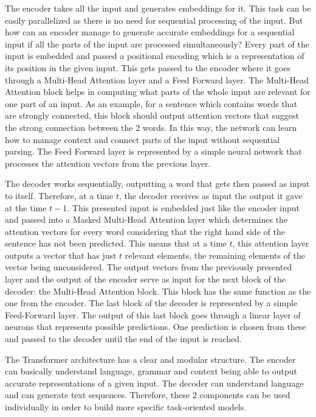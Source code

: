\documentclass[12pt,a4paper]{report}
\begin{document}
The encoder takes all the input and generates embeddings for it. This task can be easily parallelized as there is no need for sequential processing of the input. But how can an encoder manage to generate accurate embeddings for a sequential input if all the parts of the input are processed simultaneously? Every part of the input is embedded and passed a positional encoding which is a representation of its position in the given input. This gets passed to the encoder where it goes through a Multi-Head Attention layer and a Feed Forward layer. The Multi-Head Attention block helps in computing what parts of the whole input are relevant for one part of an input. As an example, for a sentence which contains words that are strongly connected, this block should output attention vectors that suggest the strong connection between the 2 words. In this way, the network can learn how to manage context and connect parts of the input without sequential parsing. The Feed Forward layer is represented by a simple neural network that processes the attention vectors from the previous layer.

The decoder works sequentially, outputting a word that gets then passed as input to itself. Therefore, at a time $t$, the decoder receives as input the output it gave at the time $t-1$. This presented input is embedded just like the encoder input and passed into a Masked Multi-Head Attention layer which determines the attention vectors for every word considering that the right hand side of the sentence has not been predicted. This means that at a time $t$, this attention layer outputs a vector that has just $t$ relevant elements, the remaining elements of the vector being unconsidered. The output vectors from the previously presented layer and the output of the encoder serve as input for the next block of the decoder: the Multi-Head Attention block. This block has the same function as the one from the encoder. The last block of the decoder is represented by a simple Feed-Forward layer. The output of this last block goes through a linear layer of neurons that represents possible predictions. One prediction is chosen from these and passed to the decoder until the end of the input is reached.


The Transformer architecture has a clear and modular structure. The encoder can basically understand language, grammar and context being able to output accurate representations of a given input. The decoder can understand language and can generate text sequences. Therefore, these 2 components can be used individually in order to build more specific task-oriented models. 
\end{document}
